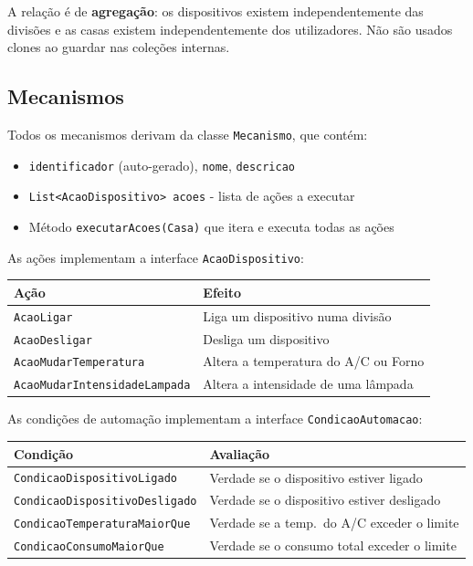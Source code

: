 \documentclass[a4paper]{article}
\begin{document}
A relação é de \textbf{agregação}: os dispositivos existem independentemente das divisões e as casas existem independentemente dos utilizadores. Não são usados clones ao guardar nas coleções internas.

\subsection{Mecanismos}

Todos os mecanismos derivam da classe \texttt{Mecanismo}, que contém:

\begin{itemize}
    \item \texttt{identificador} (auto-gerado), \texttt{nome}, \texttt{descricao}
    \item \texttt{List<AcaoDispositivo> acoes} - lista de ações a executar
    \item Método \texttt{executarAcoes(Casa)} que itera e executa todas as ações
\end{itemize}

As ações implementam a interface \texttt{AcaoDispositivo}:

\begin{center}
\begin{tabular}{ll}
    \toprule
    \textbf{Ação} & \textbf{Efeito} \\
    \midrule
    \texttt{AcaoLigar} & Liga um dispositivo numa divisão \\
    \texttt{AcaoDesligar} & Desliga um dispositivo \\
    \texttt{AcaoMudarTemperatura} & Altera a temperatura do A/C ou Forno \\
    \texttt{AcaoMudarIntensidadeLampada} & Altera a intensidade de uma lâmpada \\
    \bottomrule
\end{tabular}
\end{center}

As condições de automação implementam a interface \texttt{CondicaoAutomacao}:

\begin{center}
\begin{tabular}{ll}
    \toprule
    \textbf{Condição} & \textbf{Avaliação} \\
    \midrule
    \texttt{CondicaoDispositivoLigado} & Verdade se o dispositivo estiver ligado \\
    \texttt{CondicaoDispositivoDesligado} & Verdade se o dispositivo estiver desligado \\
    \texttt{CondicaoTemperaturaMaiorQue} & Verdade se a temp.\ do A/C exceder o limite \\
    \texttt{CondicaoConsumoMaiorQue} & Verdade se o consumo total exceder o limite \\
    \bottomrule
\end{tabular}
\end{center}
\end{document}
